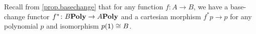 \documentclass[Book-Poly]{subfiles}
\begin{document}




Recall from \cref{prop.basechange} that for any function $f\colon A\to B$, we have a base-change functor $f^*\colon B\mathbf{Poly}\to A\mathbf{Poly}$ and a cartesian morphism $f^*p\to p$ for any polynomial $p$ and isomorphism $p(\textsf{1})\cong B$.
\end{document}
